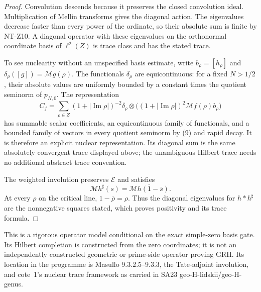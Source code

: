 \documentclass[11pt,a4paper]{article}
\begin{document}
\begin{proof}
Convolution descends because it preserves the closed
convolution ideal. Multiplication of Mellin transforms
gives the diagonal action. The eigenvalues decrease
faster than every power of the ordinate, so their
absolute sum is finite by NT-Z10. A diagonal operator
with these eigenvalues on the orthonormal coordinate
basis of $\ell^2(Z)$ is trace class and has the stated
trace.

To see nuclearity without an unspecified basis estimate,
write $b_\rho=[h_\rho]$ and
$\delta_\rho([g])=\mathcal Mg(\rho)$. The functionals
$\delta_\rho$ are equicontinuous: for a fixed
$N>1/2$, their absolute values are uniformly bounded
by a constant times the quotient seminorm of $p_{N,0}$.
The representation
\[
 C_f=\sum_{\rho\in Z}(1+|\operatorname{Im}\rho|)^{-2}
       \delta_\rho\otimes
       \bigl((1+|\operatorname{Im}\rho|)^2
                                  \mathcal Mf(\rho)b_\rho\bigr)
\]
has summable scalar coefficients, an equicontinuous
family of functionals, and a bounded family of vectors
in every quotient seminorm by (9) and rapid decay.
It is therefore an explicit nuclear representation.
Its diagonal sum is the same absolutely convergent
trace displayed above; the unambiguous Hilbert
trace needs no additional abstract trace convention.

The weighted involution preserves $\mathcal E$ and satisfies
\[
      \mathcal M h^\sharp(s)
                =\overline{\mathcal Mh(1-\overline s)}.
\]
At every $\rho$ on the critical line,
$1-\overline\rho=\rho$. Thus the diagonal eigenvalues
for $h*h^\sharp$ are the nonnegative squares stated,
which proves positivity and its trace formula.
\end{proof}

This is a rigorous operator model conditional on the exact
simple-zero basis gate. Its Hilbert completion is constructed
from the zero coordinates; it is not an independently
constructed geometric or prime-side operator proving GRH.
Its location in the programme is Masullo 9.3.2.5--9.3.3,
the Tate-adjoint involution, and cote~1's nuclear trace
framework as carried in SA23 geo-H-lidskii/geo-H-genus.
\end{document}
